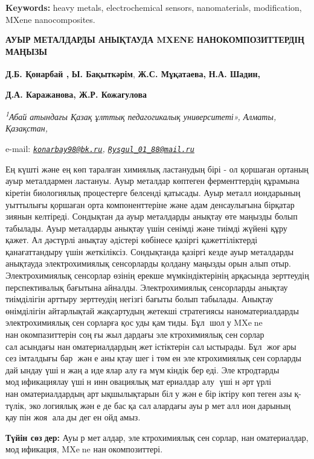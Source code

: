 {{\bfseries Keywords:} heavy metals, electrochemical sensors, nanomaterials,
modification, MXene nanocomposites.

{\bfseries АУЫР МЕТАЛДАРДЫ АНЫҚТАУДА MXENE НАНОКОМПОЗИТТЕРДІҢ МАҢЫЗЫ}

{\bfseries Д.Б. Қонарбай\textsuperscript{\envelope } ,} {\bfseries Ы.
Бақыткәрім\textsuperscript{\envelope }}, {\bfseries Ж.С. Мұқатаева,} {\bfseries Н.А.
Шадин,}

{\bfseries Д.А. Каражанова, Ж.Р. Кожагулова}

\emph{\textsuperscript{1}Абай атындағы Қазақ ұлттық педагогикалық
университеті», Алматы, Қазақстан,}

e-mail:
\emph{\href{mailto:konarbay98@bk.ru}{\nolinkurl{konarbay98@bk.ru}},
\href{mailto:Rysgul_01_88@mail.ru}{\nolinkurl{Rysgul\_01\_88@mail.ru}}}

Ең күшті және ең көп таралған химиялық ластанудың бірі - ол қоршаған
ортаның ауыр металдармен ластануы. Ауыр металдар көптеген ферменттердің
құрамына кіретін биологиялық процестерге белсенді қатысады. Ауыр металл
иондарының уыттылығы қоршаған орта компоненттеріне және адам
денсаулығына бірқатар зиянын келтіреді. Сондықтан да ауыр металдарды
анықтау өте маңызды болып табылады. Ауыр металдарды анықтау үшін сенімді
және тиімді жүйені құру қажет. Ал дәстүрлі анықтау әдістері көбінесе
қазіргі қажеттіліктерді қанағаттандыру үшін жеткіліксіз. Сондықтанда
қазіргі кезде ауыр металдарды анықтауда электрохимиялық сенсорларды
қолдану маңызды орын алып отыр. Электрохимиялық сенсорлар өзінің ерекше
мүмкіндіктерінің арқасында зерттеудің перспективалық бағытына айналды.
Электрохимиялық сенсорларды анықтау тиімділігін арттыру зерттеудің
негізгі бағыты болып табылады. Анықтау өнімділігін айтарлықтай
жақсартудың жетекші стратегиясы наноматериалдарды электрохимиялық
сенсорларға қосуды қамтиды. Бұл шолу MXene нанокомпазиттерін
соңғы жылдардағы электрохимиялық сенсорлар саласындағы
наноматериалдардың жетістіктерін салыстырады. Бұл жоғары
сезімталдығы бар және анықтау шегі төмен электрохимиялық
сенсорларды дайындау үшін жаңа идеялар алуға мүмкіндік береді.
Электродтарды модификациялау үшін инновациялық материалдар алу
үшін әртүрлі наноматериалдардың артықшылықтарын білу және
біріктіру көптеген азық-түлік, экологиялық және де басқа
салалардағы ауыр металл иондарының қаупін жоя алады деген
ойдамыз.

{\bfseries Түйін сөздер:} Ауы{\bfseries }р металдар, электрохимиялық
сенсорлар, наноматериалдар, модификация, MXene нанокомпозиттері.

}
